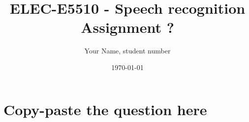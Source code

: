 \documentclass[article,11pt]{article}
\title{ELEC-E5510 - Speech recognition \\ Assignment ?}
\author{Your Name, student number}
\date{\today}
\begin{document}
\maketitle

\section{Copy-paste the question here}

\end{document}
